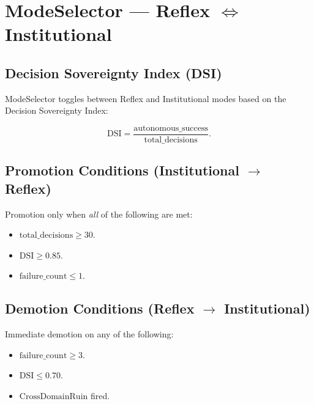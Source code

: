 
\chapter{ModeSelector --- Reflex $\Leftrightarrow$ Institutional}
\label{ch:mode-selector}

\section{Decision Sovereignty Index (DSI)}
\label{sec:dsi-definition}

ModeSelector toggles between Reflex and Institutional modes based on
the Decision Sovereignty Index:

\begin{equation}
\mathrm{DSI} = \frac{\mathrm{autonomous\_success}}
{\mathrm{total\_decisions}}.
\label{eq:dsi-definition}
\end{equation}

\section{Promotion Conditions (Institutional $\to$ Reflex)}
\label{sec:dsi-promotion}

Promotion only when \emph{all} of the following are met:

\begin{itemize}
\item $\mathrm{total\_decisions} \ge 30$.
\item $\mathrm{DSI} \ge 0.85$.
\item $\mathrm{failure\_count} \le 1$.
\end{itemize}

\section{Demotion Conditions (Reflex $\to$ Institutional)}
\label{sec:dsi-demotion}

Immediate demotion on any of the following:

\begin{itemize}
\item $\mathrm{failure\_count} \ge 3$.
\item $\mathrm{DSI} \le 0.70$.
\item $\mathrm{CrossDomainRuin}$ fired.
\end{itemize}

